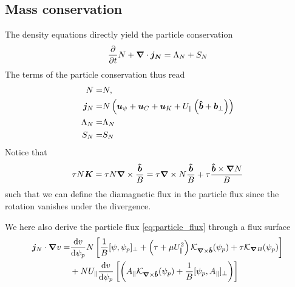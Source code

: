 \subsection{Mass conservation}
The density equations directly yield the particle conservation
\begin{align} \label{eq:mass_theorem}
  \frac{\partial}{\partial t} N
  + {\boldsymbol{\nabla}}\cdot{\boldsymbol{ j_{N}}}
  =  \Lambda_{N}+S_{N}
\end{align}
The terms of the particle conservation thus read
\begin{align}
  N= & N,\\
  {\boldsymbol{j}}_{N} =& N\left(
  {\boldsymbol{u}}_\psi + {\boldsymbol{u}}_C + {\boldsymbol{u}}_{K} +U_\parallel\left(\bm{\hat{b}}+{{\boldsymbol{b}}}_\perp\right)  \right)
\label{eq:particle_flux}\\
  \Lambda_{N} =& \Lambda_N
\\
  S_{N} =&  S_{N}
\end{align}
Notice that
\begin{align}
\tau N {\boldsymbol{K}} = \tau N{\boldsymbol{\nabla}}\times\frac{\bm{\hat{b}}}{B} = \tau {\boldsymbol{\nabla}}\times N\frac{\bm{\hat{b}}}{B} + \tau \frac{\bm{\hat{b}}\times{\boldsymbol{\nabla}} N}{B}
\label{}
\end{align}
such that we can define the diamagnetic flux in the particle flux since
the rotation vanishes under the divergence.

We here also derive the particle flux \eqref{eq:particle_flux} through a flux surface
\begin{align} \label{eq:radial_particle_flux}
 \vec j_{N}\cn v %
 =&
  \frac{\d v}{\d \psi_p} N\left[\frac{1}{B}[\psi, \psi_p]_\perp + \left(\tau + \mu U_\parallel^2\right)
   \mathcal K_{\vn\times\bhat}(\psi_p) + \tau  \mathcal K_{\vn B}(\psi_p) \right] \nonumber\\
 &+ NU_\parallel\frac{\d v}{\d \psi_p}\left [\left( A_\parallel \mathcal
 K_{\vn\times\bhat}(\psi_p) + \frac{1}{B}[\psi_p, A_\parallel]_\perp\right) \right]
\end{align}

